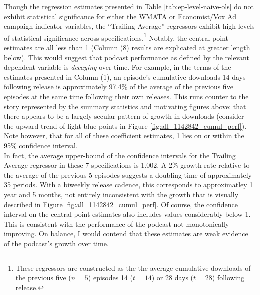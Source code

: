 \documentclass[11pt, letterpaper, twoside]{article}
\begin{document}
Though the regression estimates presented in Table \ref{tab:ep-level-naive-ols} do not exhibit statistical significance for either the WMATA or Economist/Vox Ad campaign indicator variables, the ``Trailing Average'' regressors exhibit high levels of statistical significance across specifications.\footnote{These regressors are constructed as the the average cumulative downloads of the previous five ($n=5$) episodes 14 ($t=14$) or 28 days ($t=28$) following release.} Notably, the central point estimates are all less than 1 (Column (8) results are explicated at greater length below). This would suggest that podcast performance as defined by the relevant dependent variable is \textit{decaying} over time. For example, in the terms of the estimates presented in Column (1), an episode's cumulative downloads 14 days following release is approximately 97.4\% of the average of the previous five episodes at the same time following their own releases. This runs counter to the story represented by the summary statistics and motivating figures above: that there appears to be a largely secular pattern of growth in downloads (consider the upward trend of light-blue points in Figure \ref{fig:all_1142842_cumul_perf}). Note however, that for all of these coefficient estimates, 1 lies on or within the 95\% confidence interval.\\

In fact, the average upper-bound of the confidence intervals for the Trailing Average regressor in these 7 specifications is 1.002. A 2\% growth rate relative to the average of the previous 5 episodes suggests a doubling time of approximately 35 periods. With a biweekly release cadence, this corresponds to approximatley 1 year and 5 months, not entirely inconsistent with the growth that is visually described in Figure \ref{fig:all_1142842_cumul_perf}. Of course, the confidence interval on the central point estimates also includes values considerably below 1. This is consistent with the performance of the podcast not monotonically improving. On balance, I would contend that these estimates are weak evidence of the podcast's growth over time.\\
\end{document}
